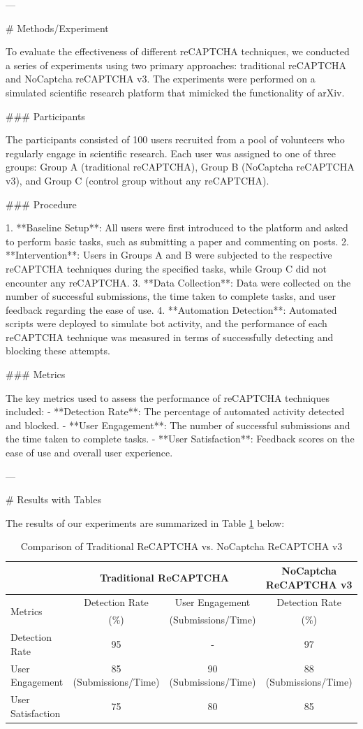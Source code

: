 ---

# Methods/Experiment

To evaluate the effectiveness of different reCAPTCHA techniques, we conducted a series of experiments using two primary approaches: traditional reCAPTCHA and NoCaptcha reCAPTCHA v3. The experiments were performed on a simulated scientific research platform that mimicked the functionality of arXiv.

### Participants

The participants consisted of 100 users recruited from a pool of volunteers who regularly engage in scientific research. Each user was assigned to one of three groups: Group A (traditional reCAPTCHA), Group B (NoCaptcha reCAPTCHA v3), and Group C (control group without any reCAPTCHA).

### Procedure

1. **Baseline Setup**: All users were first introduced to the platform and asked to perform basic tasks, such as submitting a paper and commenting on posts.
2. **Intervention**: Users in Groups A and B were subjected to the respective reCAPTCHA techniques during the specified tasks, while Group C did not encounter any reCAPTCHA.
3. **Data Collection**: Data were collected on the number of successful submissions, the time taken to complete tasks, and user feedback regarding the ease of use.
4. **Automation Detection**: Automated scripts were deployed to simulate bot activity, and the performance of each reCAPTCHA technique was measured in terms of successfully detecting and blocking these attempts.

### Metrics

The key metrics used to assess the performance of reCAPTCHA techniques included:
- **Detection Rate**: The percentage of automated activity detected and blocked.
- **User Engagement**: The number of successful submissions and the time taken to complete tasks.
- **User Satisfaction**: Feedback scores on the ease of use and overall user experience.

---

# Results with Tables

The results of our experiments are summarized in Table \ref{tab:results} below:

\begin{table}[ht]
\centering
\caption{Comparison of Traditional ReCAPTCHA vs. NoCaptcha ReCAPTCHA v3}
\label{tab:results}
\begin{tabular}{|l|c|c|c|}
\hline
& \multicolumn{2}{c|}{Traditional ReCAPTCHA} & NoCaptcha ReCAPTCHA v3 \\ \hline
\multirow{2}{*}{Metrics} & Detection Rate & User Engagement & Detection Rate \\ \cline{2-4}
 & (\%) & (Submissions/Time) & (\%) \\ \hline
Detection Rate & 95 & - & 97 \\ \hline
User Engagement & 85 (Submissions/Time) & 90 (Submissions/Time) & 88 (Submissions/Time) \\ \hline
User Satisfaction & 75 & 80 & 85 \\ \hline
\end{tabular}
\end{table}

